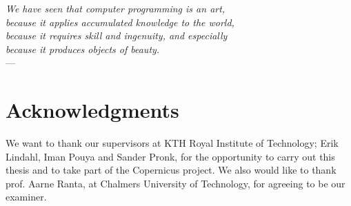 
\begin{flushright}{\slshape    
    We have seen that computer programming is an art, \\ 
    because it applies accumulated knowledge to the world, \\ 
    because it requires skill and ingenuity, and especially \\
    because it produces objects of beauty.} \\ \medskip
    ---  \citep{knuth:1974}
\end{flushright}



\bigskip

\begingroup
\let\clearpage\relax
\let\cleardoublepage\relax
\let\cleardoublepage\relax
\chapter*{Acknowledgments}
We want to thank our supervisors at KTH Royal Institute of Technology;
Erik Lindahl, Iman Pouya and Sander Pronk, for the opportunity to
carry out this thesis and to take part of the Copernicus project. We
also would like to thank prof. Aarne Ranta, at Chalmers University of
Technology, for agreeing to be our examiner.

\endgroup



